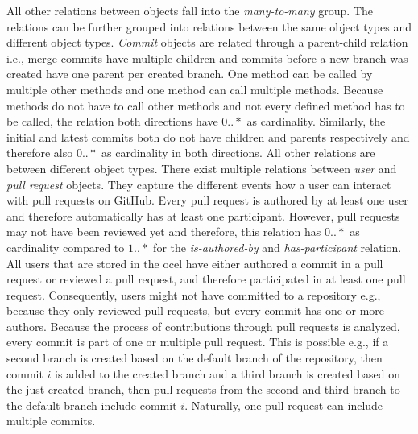 All other relations between objects fall into the \emph{many-to-many} group. The relations can be further grouped into relations between the same object types and different object types. 
\emph{Commit} objects are related through a parent-child relation i.e., merge commits have multiple children and commits before a new branch was created have one parent per created branch. One method can be called by multiple other methods and one method can call multiple methods. Because methods do not have to call other methods and not every defined method has to be called, the relation both directions have $0..*$ as cardinality. Similarly, the initial and latest commits both do not have children and parents respectively and therefore also $0..*$ as cardinality in both directions.
All other relations are between different object types. There exist multiple relations between \emph{user} and \emph{pull request} objects. They capture the different events how a user can interact with pull requests on GitHub. Every pull request is authored by at least one user and therefore automatically has at least one participant. However, pull requests may not have been reviewed yet and therefore, this relation has $0..*$ as cardinality compared to $1..*$ for the \emph{is-authored-by} and \emph{has-participant} relation. All users that are stored in the \ac{ocel} have either authored a commit in a pull request or reviewed a pull request, and therefore participated in at least one pull request. Consequently, users might not have committed to a repository e.g., because they only reviewed pull requests, but every commit has one or more authors. Because the process of contributions through pull requests is analyzed, every commit is part of one or multiple pull request. This is possible e.g., if a second branch is created based on the default branch of the repository, then commit $i$ is added to the created branch and a third branch is created based on the just created branch, then pull requests from the second and third branch to the default branch include commit $i$. Naturally, one pull request can include multiple commits.
